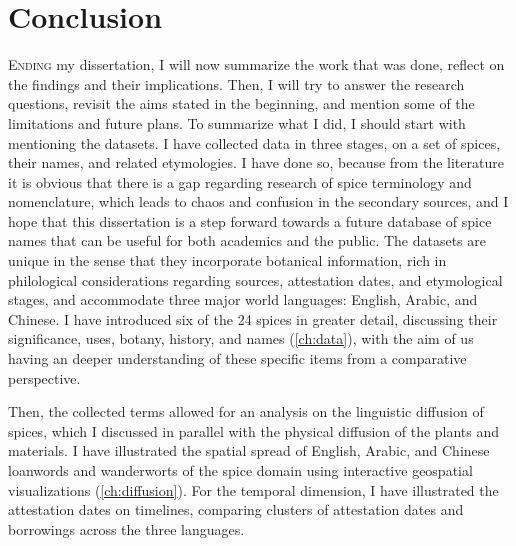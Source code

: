 \chapter{Conclusion}
\label{ch:conclusion}


\lettrine[lines=\iniciale]{\textcolor{\accentcolor}{E}}{nding} my dissertation, I will now summarize the work that was done, reflect on the findings and their implications. Then, I will try to answer the research questions, revisit the aims stated in the beginning, and mention some of the limitations and future plans. To summarize what I did, I should start with mentioning the datasets. I have collected data in three stages, on a set of spices, their names, and related etymologies. I have done so, because from the literature it is obvious that there is a gap regarding research of spice terminology and nomenclature, which leads to chaos and confusion in the secondary sources, and I hope that this dissertation is a step forward towards a future database of spice names that can be useful for both academics and the public. The datasets are unique in the sense that they incorporate botanical information, rich in philological considerations regarding sources, attestation dates, and etymological stages, and accommodate three major world languages: English, Arabic, and Chinese. I have introduced six of the 24 spices in greater detail, discussing their significance, uses, botany, history, and names (\cref{ch:data}), with the aim of us having an deeper understanding of these specific items from a comparative perspective. 

Then, the collected terms allowed for an analysis on the linguistic diffusion of spices, which I discussed in parallel with the physical diffusion of the plants and materials. I have illustrated the spatial spread of English, Arabic, and Chinese loanwords and \glspl{wanderwort} of the spice domain using interactive geospatial visualizations (\cref{ch:diffusion}). For the temporal dimension, I have illustrated the attestation dates on timelines, comparing clusters of attestation dates and borrowings across the three languages. 

